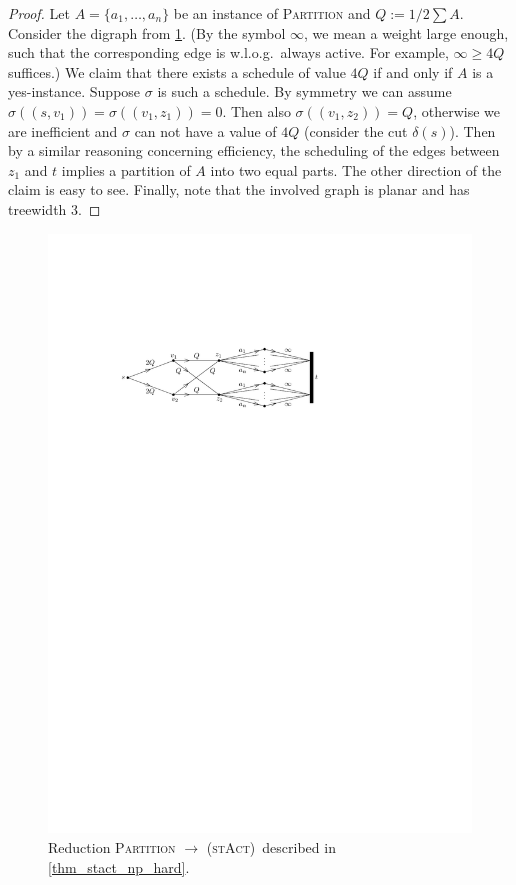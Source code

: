 \documentclass[runningheads]{llncs}
\numberwithin{equation}{section}
\newcommand{\set}[1]{\{ #1 \}}
\newcommand{\fromto}[2]{\set{#1, \ldots, #2}}
\newcommand{\stact}{\textsc{(stAct)}}
\begin{document}
\begin{proof}
Let $A = \fromto{a_1}{a_n}$ be an instance of \textsc{Partition} and $Q := 1/2 \sum A$. Consider the digraph from \cref{fig_stact_np_hard}. (By the symbol $\infty$, we mean a weight large enough, such that the corresponding edge is w.l.o.g.\ always active. For example, $\infty \geq 4Q$ suffices.) We claim that there exists a schedule of value $4Q$ if and only if $A$ is a yes-instance. Suppose $\sigma$ is such a schedule. By symmetry we can assume $\sigma((s,v_1)) = \sigma((v_1, z_1)) = 0$. Then also $\sigma((v_1, z
_2)) = Q$, otherwise we are inefficient and $\sigma$ can not have a value of $4Q$ (consider the cut $\delta(s)$). Then by a similar reasoning concerning efficiency, the scheduling of the edges between $z_1$ and $t$ implies a partition of $A$ into two equal parts. The other direction of the claim is easy to see. Finally, note that the involved graph is 
planar and has treewidth 3.
\end{proof}
\begin{figure}[htpb]
\centering
\includegraphics[scale=1]{img/st-act-np-hard}
\caption{Reduction \textsc{Partition} $\rightarrow$ \stact\ described in \cref{thm_stact_np_hard}.}
\label{fig_stact_np_hard}
\end{figure}
\end{document}
